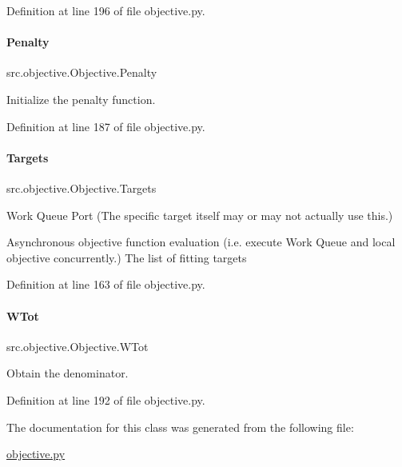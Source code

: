 Definition at line 196 of file objective.\+py.

\mbox{\label{classsrc_1_1objective_1_1Objective_ad5ca5b9e6cc7d044db4ff26e02ae0ad3}} 
\paragraph{\texorpdfstring{Penalty}{Penalty}}
{\footnotesize\ttfamily src.\+objective.\+Objective.\+Penalty}



Initialize the penalty function. 



Definition at line 187 of file objective.\+py.

\mbox{\label{classsrc_1_1objective_1_1Objective_a13eee4f9a973a4126cf621a71cf9458d}} 
\paragraph{\texorpdfstring{Targets}{Targets}}
{\footnotesize\ttfamily src.\+objective.\+Objective.\+Targets}



Work Queue Port (The specific target itself may or may not actually use this.) 

Asynchronous objective function evaluation (i.\+e. execute Work Queue and local objective concurrently.) The list of fitting targets 

Definition at line 163 of file objective.\+py.

\mbox{\label{classsrc_1_1objective_1_1Objective_aa9804c666636ac4eb64869cf03ca5a19}} 
\paragraph{\texorpdfstring{W\+Tot}{WTot}}
{\footnotesize\ttfamily src.\+objective.\+Objective.\+W\+Tot}



Obtain the denominator. 



Definition at line 192 of file objective.\+py.



The documentation for this class was generated from the following file\+:\begin{DoxyCompactItemize}
\item 
\hyperlink{objective_8py}{objective.\+py}\end{DoxyCompactItemize}
